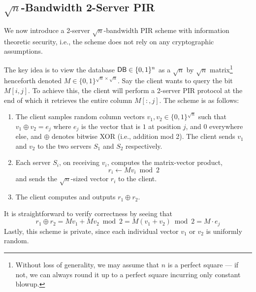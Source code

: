 \subsection{$\sqrt{n}$-Bandwidth 
2-Server PIR} %
We now introduce a 2-server $\sqrt{n}$-bandwidth
PIR scheme 
with information theoretic security, i.e., 
the scheme does not rely on any cryptographic assumptions.

The key idea is to view the database ${\sf DB} \in \{0,1\}^n$ 
as a
$\sqrt{n}$ by $\sqrt{n}$ matrix\footnote{
Without loss of generality, we may assume that $n$ 
is a perfect square --- if not, we can always round it up to a perfect square
incurring only constant blowup.}
henceforth denoted
$M \in \{0, 1\}^{\sqrt{n} \times \sqrt{n}}$.
Say the client wants to query %
the bit $M[i, j]$.
To achieve this, the client will perform
a 2-server PIR protocol
at the  end of which it retrieves
the entire column $M[:, j]$.
The scheme is as follows:
\begin{enumerate}
\item The client samples random column vectors 
$v_{1},v_{2} \in \{0, 1\}^{\sqrt{n}}$ 
such that 
$v_1 \oplus v_2 = e_j$ where $e_j$
is the vector that is $1$    
at position $j$, and $0$ everywhere else,
and $\oplus$ denotes bitwise XOR (i.e., addition mod 2).
The client sends $v_1$ and $v_2$ 
to the two servers $S_1$ and $S_2$ respectively.
	\item Each server $S_i$, on receiving $v_i$, 
computes the matrix-vector product,
	\[r_{i} \leftarrow M v_{i} \bmod 2\]
	and sends the $\sqrt{n}$-sized vector $r_{i}$ to the client.
	\item The client computes and outputs $r_{1} \oplus r_{2}$.
\end{enumerate}
It is straightforward to verify correctness by seeing that
\[r_{1} \oplus r_{2} = M v_{1} + M v_{2} \bmod 2 = 
M (v_{1} + v_{2}) \bmod 2 = M \cdot e_j \]
Lastly, this scheme is private, since 
each individual vector $v_{1}$ or $v_{2}$ 
is uniformly random.

